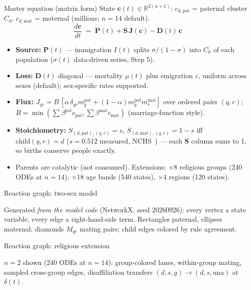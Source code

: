 \documentclass[10pt]{beamer}
\begin{document}
\begin{frame}{Master equation (matrix form)}
  State $\mathbf{c}(t)\in\mathbb{R}^{2(n+1)}$: $c_{d,\mathrm{pat}}$ = paternal cluster $C_d$, $c_{d,\mathrm{mat}}$ = maternal (millions; $n=14$ default).
  \begin{equation*}
    \frac{d\mathbf{c}}{dt} \;=\; \mathbf{P}(t) + \mathbf{S}\,\mathbf{J}(\mathbf{c}) - \mathbf{D}(t)\,\mathbf{c}
  \end{equation*}
  \begin{itemize}
    \item \textbf{Source:} $\mathbf{P}(t)$ --- immigration $I(t)$ splits $\sigma/(1{-}\sigma)$ into $C_0$ of each population ($\sigma(t)$ data-driven series, Step 5).
    \item \textbf{Loss:} $\mathbf{D}(t)$ diagonal --- mortality $\mu(t)$ plus emigration $\varepsilon$, uniform across sexes (default); sex-specific rates supported.
    \item \textbf{Flux:} $J_{qr} = B\,[\alpha\,\delta_{qr}m^{\mathrm{pat}}_q + (1-\alpha)m^{\mathrm{pat}}_q m^{\mathrm{mat}}_r]$ over ordered pairs $(q,r)$; $B=\min(\sum\beta^{\mathrm{pat}}c_{\mathrm{pat}},\sum\beta^{\mathrm{mat}}c_{\mathrm{mat}})$ (marriage-function style).
    \item \textbf{Stoichiometry:} $S_{(d,\mathrm{pat}),(q,r)}=s$, $S_{(d,\mathrm{mat}),(q,r)}=1{-}s$ iff $\mathrm{child}(q,r)=d$ ($s=0.512$ measured, NCHS~\cite{nchs-natality}) --- each $\mathbf{S}$ column sums to 1, so births conserve people exactly.
    \item Parents are catalytic (not consumed). Extensions: $\times$8 religious groups (240 ODEs at $n{=}14$), $\times$18 age bands (540 states), $\times$4 regions (120 states).
  \end{itemize}
\end{frame}

\begin{frame}{Reaction graph: two-sex model}
  \centering
  \resizebox{!}{0.74\textheight}{}

  {\small Generated \emph{from the model code} (NetworkX, seed 20260926): every vertex a state variable, every edge a right-hand-side term. Rectangles paternal, ellipses maternal; diamonds $M_{qr}$ mating pairs; child edges colored by rule agreement.}
\end{frame}

\begin{frame}{Reaction graph: religious extension}
  \centering
  \resizebox{\textwidth}{!}{}

  {\small $n{=}2$ shown (240 ODEs at $n{=}14$): group-colored lanes, within-group mating, sampled cross-group edges, disaffiliation transfers $(d,s,g){\to}(d,s,\mathrm{una})$ at $\delta(t)$.}
\end{frame}
\end{document}
